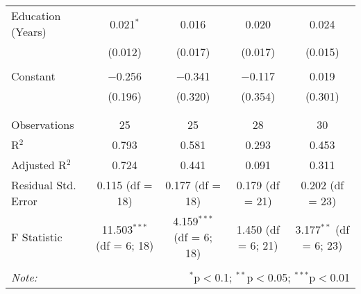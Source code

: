 \begin{table}[!htbp]
\begin{tabular}{@{\extracolsep{5pt}}lcccc}
 Education (Years) & 0.021$^{*}$ & 0.016 & 0.020 & 0.024 \\ 
  & (0.012) & (0.017) & (0.017) & (0.015) \\ 
  & & & & \\ 
 Constant & $-$0.256 & $-$0.341 & $-$0.117 & 0.019 \\ 
  & (0.196) & (0.320) & (0.354) & (0.301) \\ 
  & & & & \\ 
\hline \\[-1.8ex] 
Observations & 25 & 25 & 28 & 30 \\ 
R$^{2}$ & 0.793 & 0.581 & 0.293 & 0.453 \\ 
Adjusted R$^{2}$ & 0.724 & 0.441 & 0.091 & 0.311 \\ 
Residual Std. Error & 0.115 (df = 18) & 0.177 (df = 18) & 0.179 (df = 21) & 0.202 (df = 23) \\ 
F Statistic & 11.503$^{***}$ (df = 6; 18) & 4.159$^{***}$ (df = 6; 18) & 1.450 (df = 6; 21) & 3.177$^{**}$ (df = 6; 23) \\ 
\hline 
\hline \\[-1.8ex] 
\textit{Note:}  & \multicolumn{4}{r}{$^{*}$p$<$0.1; $^{**}$p$<$0.05; $^{***}$p$<$0.01} \\ 
\end{tabular} 
\end{table} 
